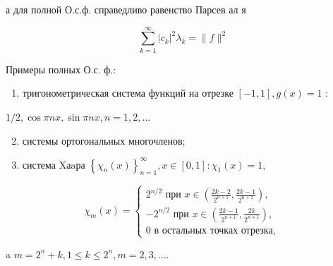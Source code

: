 \documentclass[10pt]{article}
\begin{document}
а для полной О.с.ф. справедливо равенство Парсев ал я



\[

\sum_{k=1}^{\infty}\left|c_{k}\right|^{2} \lambda_{k}=\|f\|^{2}

\]



Примеры полных О.с. ф.:



\begin{enumerate}

  \item тригонометрическая система функций на отрезке $[-1,1], g(x)=1$ :

\end{enumerate}



$1 / 2, \cos \pi n x, \sin \pi n x, n=1,2, \ldots$



\begin{enumerate}

  \setcounter{enumi}{1}

  \item системы ортогональных многочленов;



  \item система Xаaра $\left\{\chi_{n}(x)\right\}_{n=1}^{\infty}, x \in[0,1]: \chi_{1}(x)=1$,



\end{enumerate}



\[

\chi_{m}(x)=\left\{\begin{array}{l}

2^{n / 2} \text { при } x \in\left(\frac{2 k-2}{2^{n+1}}, \frac{2 k-1}{2^{n+1}}\right), \\

-2^{n / 2} \text { при } x \in\left(\frac{2 k-1}{2^{n+1}}, \frac{2 k}{2^{n+1}}\right), \\

0 \text { в остальных точках отрезка, }

\end{array}\right.

\]



a $m=2^{n}+k, 1 \leqslant k \leqslant 2^{n}, m=2,3, \ldots$.
\end{document}
